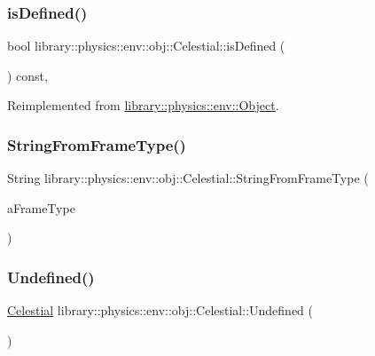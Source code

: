 \subsubsection{\texorpdfstring{is\+Defined()}{isDefined()}}
{\footnotesize\ttfamily bool library\+::physics\+::env\+::obj\+::\+Celestial\+::is\+Defined (\begin{DoxyParamCaption}{ }\end{DoxyParamCaption}) const\hspace{0.3cm}{\ttfamily [override]}, {\ttfamily [virtual]}}



Reimplemented from \hyperlink{classlibrary_1_1physics_1_1env_1_1_object_a7035edc921681401ddd43b094645a024}{library\+::physics\+::env\+::\+Object}.

\mbox{\label{classlibrary_1_1physics_1_1env_1_1obj_1_1_celestial_a020864aa551a1ec6f5674cc2e166b131}} 
\subsubsection{\texorpdfstring{String\+From\+Frame\+Type()}{StringFromFrameType()}}
{\footnotesize\ttfamily String library\+::physics\+::env\+::obj\+::\+Celestial\+::\+String\+From\+Frame\+Type (\begin{DoxyParamCaption}\item[{const \hyperlink{classlibrary_1_1physics_1_1env_1_1obj_1_1_celestial_a8585fb32125cb6c73ae1339a5ea09c79}{Celestial\+::\+Frame\+Type} \&}]{a\+Frame\+Type }\end{DoxyParamCaption})\hspace{0.3cm}{\ttfamily [static]}}

\mbox{\label{classlibrary_1_1physics_1_1env_1_1obj_1_1_celestial_a5e33230d05d77f5e1132151ecf5e94e9}} 
\subsubsection{\texorpdfstring{Undefined()}{Undefined()}}
{\footnotesize\ttfamily \hyperlink{classlibrary_1_1physics_1_1env_1_1obj_1_1_celestial}{Celestial} library\+::physics\+::env\+::obj\+::\+Celestial\+::\+Undefined (\begin{DoxyParamCaption}{ }\end{DoxyParamCaption})\hspace{0.3cm}{\ttfamily [static]}}



